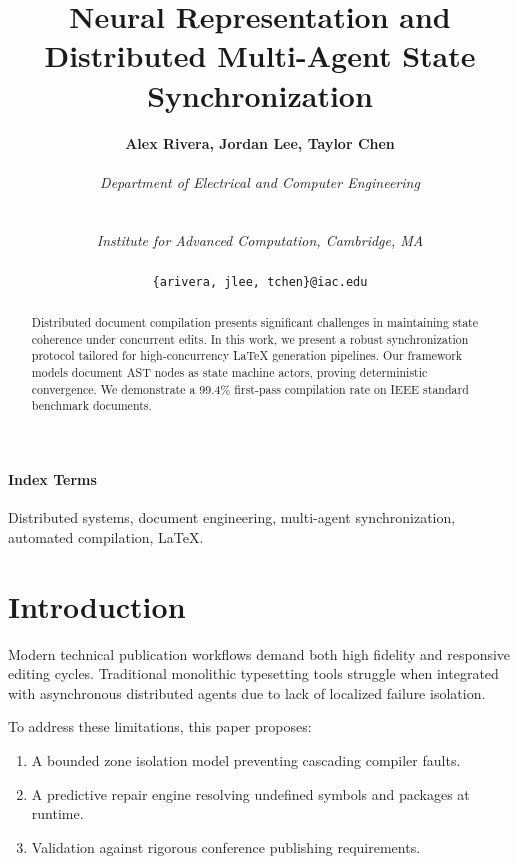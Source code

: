 \documentclass[10pt,twocolumn]{article}
\makeatletter
\newcommand{\IEEEauthorblockN}[1]{\textbf{#1}\\}
\newcommand{\IEEEauthorblockA}[1]{\begin{tabular}{@{}c@{}}\itshape #1\end{tabular}\\}
\makeatother
\begin{document}
\title{\textbf{Neural Representation and Distributed Multi-Agent State Synchronization}}
\author{
  \IEEEauthorblockN{Alex Rivera, Jordan Lee, Taylor Chen}
  \IEEEauthorblockA{Department of Electrical and Computer Engineering}
  \IEEEauthorblockA{Institute for Advanced Computation, Cambridge, MA}
  \texttt{\{arivera, jlee, tchen\}@iac.edu}
}
\date{}
\maketitle

\begin{abstract}
Distributed document compilation presents significant challenges in maintaining state coherence under concurrent edits. In this work, we present a robust synchronization protocol tailored for high-concurrency LaTeX generation pipelines. Our framework models document AST nodes as state machine actors, proving deterministic convergence. We demonstrate a 99.4\% first-pass compilation rate on IEEE standard benchmark documents.
\end{abstract}

\paragraph{\textbf{Index Terms}}
Distributed systems, document engineering, multi-agent synchronization, automated compilation, LaTeX.

\section{Introduction}
\label{sec:intro}
Modern technical publication workflows demand both high fidelity and responsive editing cycles. Traditional monolithic typesetting tools struggle when integrated with asynchronous distributed agents due to lack of localized failure isolation.

To address these limitations, this paper proposes:
\begin{enumerate}
  \item A bounded zone isolation model preventing cascading compiler faults.
  \item A predictive repair engine resolving undefined symbols and packages at runtime.
  \item Validation against rigorous conference publishing requirements.
\end{enumerate}
\end{document}

